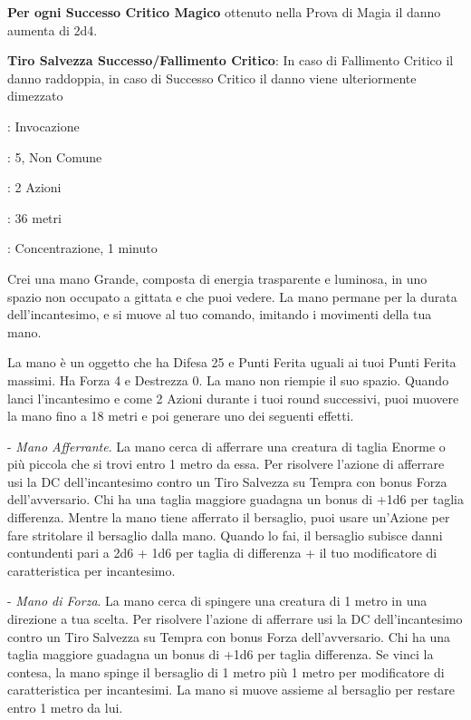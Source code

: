 \begin{multicols}{2}
\textbf{Per ogni Successo Critico Magico} ottenuto nella Prova di Magia il danno aumenta di 2d4.

\textbf{Tiro Salvezza Successo/Fallimento Critico}: In caso di Fallimento Critico il danno raddoppia, in caso di Successo Critico il danno viene ulteriormente dimezzato

\noindent\colorbox{OBSSgold!10}{
\begin{minipage}{0.95\linewidth}
\begin{description}[noitemsep, topsep=0pt, parsep=0pt, partopsep=0pt, leftmargin=0cm, labelwidth=1.3cm]
	\item[\textbf{Lista}]: Invocazione
	\item[\textbf{Livello}]: 5, Non Comune
	\item[\textbf{Lancio}]: 2 Azioni
	\item[\textbf{Gittata}]: 36 metri
	\item[\textbf{Durata}]: Concentrazione, 1 minuto
\end{description}
\end{minipage}}\smallskip

Crei una mano Grande, composta di energia trasparente e luminosa, in uno spazio non occupato a gittata e che puoi vedere. La mano permane per la durata dell'incantesimo, e si muove al tuo comando, imitando i movimenti della tua mano.

La mano è un oggetto che ha Difesa 25 e Punti Ferita uguali ai tuoi Punti Ferita massimi. Ha Forza 4 e Destrezza 0. La mano non riempie il suo spazio.
Quando lanci l'incantesimo e come 2 Azioni durante i tuoi round successivi, puoi muovere la mano fino a 18 metri e poi generare uno dei seguenti effetti.

\medskip

- \emph{Mano Afferrante}. La mano cerca di afferrare una creatura di taglia Enorme o più piccola che si trovi entro 1 metro da essa. Per risolvere l'azione di afferrare usi la DC dell'incantesimo contro un Tiro Salvezza su Tempra con bonus Forza dell'avversario.
Chi ha una taglia maggiore guadagna un bonus di +1d6 per taglia differenza.
Mentre la mano tiene afferrato il bersaglio, puoi usare un'Azione per fare stritolare il bersaglio dalla mano. Quando lo fai, il bersaglio subisce danni contundenti pari a 2d6 + 1d6 per taglia di differenza + il tuo modificatore di caratteristica per incantesimo.

- \emph{Mano di Forza}. La mano cerca di spingere una creatura di 1 metro in una direzione a tua scelta. Per risolvere l'azione di afferrare usi la DC dell'incantesimo contro un Tiro Salvezza su Tempra con bonus Forza dell'avversario. Chi ha una taglia maggiore guadagna un bonus di +1d6 per taglia differenza.
Se vinci la contesa, la mano spinge il bersaglio di 1 metro più 1 metro per modificatore di caratteristica per incantesimi. La mano si muove assieme al bersaglio per restare entro 1 metro da lui.


\end{multicols}
